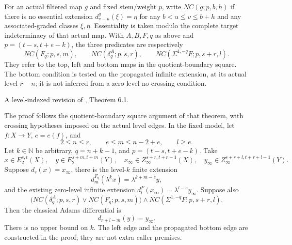 \begin{definition}
\label{sem:ProofTools:level-no-crossing}
For an actual filtered map $g$ and fixed stem/weight $p$, write $NC(g;p,b,h)$ if there is no essential extension $d_{v-u}^g(\xi)=\eta$ for any $b<u\le v\le b+h$ and any associated-graded classes $\xi,\eta$. Essentiality is taken modulo the complete target indeterminacy of that actual map. With $A,B,F,q$ as above and $p=(t-s,t+e-k)$, the three predicates are respectively
\[
NC(F_q;p,s,m),\qquad NC(\delta_q^A;p,s,r),\qquad
NC(\Sigma^{1,-q}F;p,s+r,l).
\]
They refer to the top, left and bottom maps in the quotient-boundary square. The bottom condition is tested on the propagated infinite extension, at its actual level $r-n$; it is not inferred from a zero-level no-crossing condition.
\end{definition}

\begin{theorem}
\label{sem:ProofTools:generalized-leibniz-at-level}
A level-indexed revision of \cite{LWX126}, Theorem 6.1.\par

The proof follows the quotient-boundary square argument of that theorem, with crossing hypotheses imposed on the actual level edges. In the fixed model, let $f:X\to Y$, $e=e(f)$, and
\[2\le n\le r,\qquad e\le m\le n-2+e,\qquad l\ge e.\]
Let $k\in\mathbb N$ be arbitrary, $q=n+k-1$, and $p=(t-s,t+e-k)$. Take
\[
x\in E_2^{s,t}(X),\quad y\in E_2^{s+m,t+m}(Y),\quad
x_\infty\in Z_\infty^{s+r,t+r-1}(X),\quad
y_\infty\in Z_\infty^{s+r+l,t+r+l-1}(Y).
\]
Suppose $d_r(x)=x_\infty$, there is the level-$k$ finite extension
\[d_m^{F_q}(\lambda^k x)=\lambda^{k+m-e}y,\]
and the existing zero-level infinite extension $d_l^F(x_\infty)=\lambda^{l-e}y_\infty$. Suppose also
\[
\bigl(NC(\delta_q^A;p,s,r)\lor NC(F_q;p,s,m)\bigr)
\land NC(\Sigma^{1,-q}F;p,s+r,l).
\]
Then the classical Adams differential is
\[d_{r+l-m}(y)=y_\infty.\]
There is no upper bound on $k$. The left edge and the propagated bottom edge are constructed in the proof; they are not extra caller premises.
\end{theorem}

